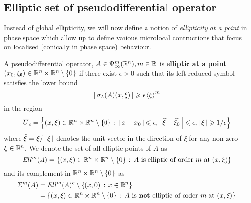 \documentclass[12pt]{article}
\begin{document}
\subsection{Elliptic set of pseudodifferential operator}
Instead of global ellipticity, we will now define a notion of \textit{ellipticity at a point} in phase space which allow up to define various microlocal contructions that focus on  localised (conically in phase space) behaviour. 

\begin{fdefinition}
    A pseudodifferential operator, $A \in \Psi^m_\infty(\R^n), m \in \R$ is \textbf{elliptic at a point} $(x_0, \xi_0) \in \R^n \times \R^n \setminus \set{0}$ if there exist $\epsilon > 0$ such that its left-reduced symbol satisfies the lower bound
    \[
    \abs{\sigma_L(A)(x, \xi)} \geq \epsilon \sym[\xi]^m
    \]
    in the region
    \[
    \overline{U}_\epsilon = \set{(x, \xi) \in \R^n \times \R^n \setminus \set{0} \wh \abs{x - x_0} \leq \epsilon, \abs{\widehat{\xi} - \widehat{\xi_0}} \leq \epsilon, \abs{\xi} \geq 1/\epsilon}
    \]
    where $\widehat{\xi} = \xi / \abs{\xi}$ denotes the unit vector in the direction of $\xi$ for any non-zero $\xi \in \R^n$. We denote the set of all elliptic points of $A$ as 
    \[
    \Ell^m(A) = \set{(x, \xi) \in \R^n \times \R^n \setminus \set{0} \wh A \text{  is elliptic of order $m$ at } (x, \xi)}
    \]
    and its complement in $\R^n \times \R^n \setminus \set{0}$ as 
    \begin{align*}
        \Char^m(A) 
        &= \Ell^m(A)^c \setminus \set{(x, 0)\wh x \in \R^n} \\
        &= \set{(x, \xi) \in \R^n \times \R^n \setminus \set{0} \wh A \text{  is \textbf{not} elliptic of order $m$ at } (x, \xi)}
    \end{align*}
\end{fdefinition}
\end{document}

